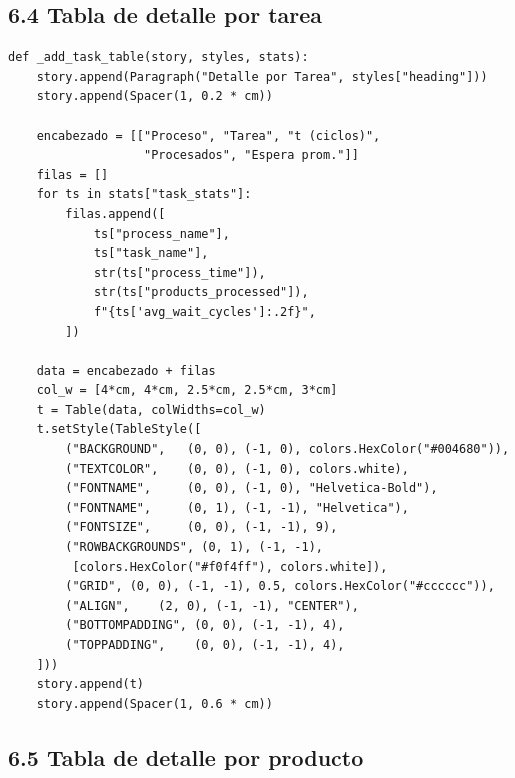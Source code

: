\documentclass[12pt,letterpaper]{article}
\begin{document}
\subsection{6.4 Tabla de detalle por tarea}

\begin{lstlisting}
def _add_task_table(story, styles, stats):
    story.append(Paragraph("Detalle por Tarea", styles["heading"]))
    story.append(Spacer(1, 0.2 * cm))

    encabezado = [["Proceso", "Tarea", "t (ciclos)",
                   "Procesados", "Espera prom."]]
    filas = []
    for ts in stats["task_stats"]:
        filas.append([
            ts["process_name"],
            ts["task_name"],
            str(ts["process_time"]),
            str(ts["products_processed"]),
            f"{ts['avg_wait_cycles']:.2f}",
        ])

    data = encabezado + filas
    col_w = [4*cm, 4*cm, 2.5*cm, 2.5*cm, 3*cm]
    t = Table(data, colWidths=col_w)
    t.setStyle(TableStyle([
        ("BACKGROUND",   (0, 0), (-1, 0), colors.HexColor("#004680")),
        ("TEXTCOLOR",    (0, 0), (-1, 0), colors.white),
        ("FONTNAME",     (0, 0), (-1, 0), "Helvetica-Bold"),
        ("FONTNAME",     (0, 1), (-1, -1), "Helvetica"),
        ("FONTSIZE",     (0, 0), (-1, -1), 9),
        ("ROWBACKGROUNDS", (0, 1), (-1, -1),
         [colors.HexColor("#f0f4ff"), colors.white]),
        ("GRID", (0, 0), (-1, -1), 0.5, colors.HexColor("#cccccc")),
        ("ALIGN",    (2, 0), (-1, -1), "CENTER"),
        ("BOTTOMPADDING", (0, 0), (-1, -1), 4),
        ("TOPPADDING",    (0, 0), (-1, -1), 4),
    ]))
    story.append(t)
    story.append(Spacer(1, 0.6 * cm))
\end{lstlisting}

\subsection{6.5 Tabla de detalle por producto}
\end{document}
